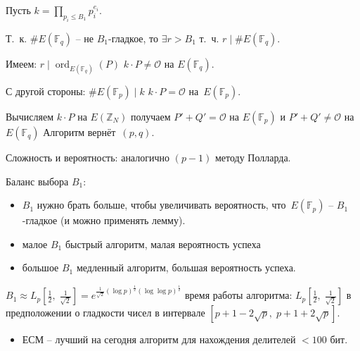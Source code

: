 \documentclass{beamer}
\begin{document}
\begin{frame}
\ProofBegin
Пусть $k = \prod\limits_{p_i \leq B_1} p_i^{e_i}$.

\vspace{0.5em}
Т.~к. $\#E(\mathbb{F}_q)$ -- не $B_1$-гладкое, то $\exists r > B_1$ т.~ч. $r \mid \#E(\mathbb{F}_q)$.

Имеем: $r \mid \operatorname{ord}_{E(\mathbb{F}_q)}(P)$ \MyImplies $k \cdot P \neq \mathcal{O}$ на $E(\mathbb{F}_q)$.
\vspace{0.5em}

С другой стороны: $\#E(\mathbb{F}_p) \mid k$ \MyImplies $k \cdot P = \mathcal{O}$ на~$E(\mathbb{F}_p)$.

Вычисляем $k \cdot P$ на $E(\mathbb{Z}_N)$ \MyImplies получаем $P' + Q' = \mathcal{O}$ на $E(\mathbb{F}_p)$ и $P' + Q' \neq \mathcal{O}$ на $E(\mathbb{F}_q)$ \MyImplies Алгоритм вернёт~$(p, q)$.

\vspace{0.5em}
Сложность и вероятность: аналогично $(p-1)$ методу Полларда. 
\ProofEnd
\end{frame}

\begin{frame}
 Баланс выбора $B_1$:
\begin{itemize}
	\item $B_1$ нужно брать больше, чтобы увеличивать вероятность, что~$E(\mathbb{F}_p)$ -- $B_1$-гладкое (и можно применять лемму).
    \item малое $B_1$ \structure{$\Rightarrow$} быстрый алгоритм, малая вероятность успеха 
    \item большое $B_1$ \structure{$\Rightarrow$} медленный алгоритм, большая вероятность успеха. 
\end{itemize}

 ${B_1} \approx {L_p}[ \frac{1}{2},\;\frac{1}{\sqrt 2 }] = e^{\frac{1}{\sqrt 2 }(\log p)^\frac{1}{2}(\log\log p)^\frac{1}{2}}$  \structure{$\Rightarrow$} время работы алгоритма: ${L_p}[ \frac{1}{2},\;\frac{1}{\sqrt 2 }]$ в предположении о гладкости чисел в интервале 
$[ {p + 1 - 2\sqrt p ,\;p + 1 + 2\sqrt p } ]$.
\begin{itemize}
    \item ЕСМ -- лучший на сегодня алгоритм для нахождения делителей $< 100$ бит.
\end{itemize} 
\end{frame}

\end{document}
